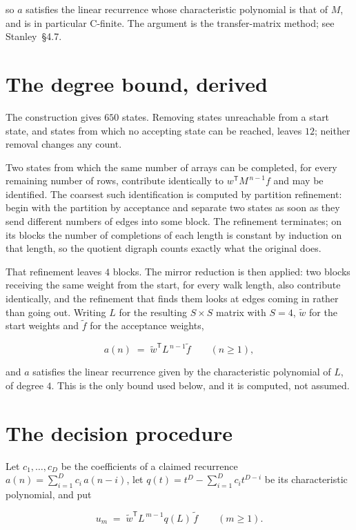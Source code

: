 \documentclass[11pt]{article}
\theoremstyle{definition}
\begin{document}
so $a$ satisfies the linear recurrence whose characteristic polynomial is that of $M$, and is in particular C-finite. The argument is the transfer-matrix method; see Stanley~\S4.7.

\section{The degree bound, derived}

The construction gives $650$ states. Removing states unreachable from a start state, and states from which no accepting state can be reached, leaves $12$; neither removal changes any count.

Two states from which the same number of arrays can be completed, for every remaining number of rows, contribute identically to $w^{\mathsf T}M^{\,n-1}f$ and may be identified. The coarsest such identification is computed by partition refinement: begin with the partition by acceptance and separate two states as soon as they send different numbers of edges into some block. The refinement terminates; on its blocks the number of completions of each length is constant by induction on that length, so the quotient digraph counts exactly what the original does.

That refinement leaves $4$ blocks. The mirror reduction is then applied: two blocks receiving the same weight from the start, for every walk length, also contribute identically, and the refinement that finds them looks at edges coming in rather than going out. Writing $L$ for the resulting $S \times S$ matrix with $S = 4$, $\tilde w$ for the start weights and $\tilde f$ for the acceptance weights,

\[a(n) \;=\; \tilde w^{\mathsf T} L^{\,n-1} \tilde f \qquad (n \ge 1),\]

and $a$ satisfies the linear recurrence given by the characteristic polynomial of $L$, of degree $4$. This is the only bound used below, and it is computed, not assumed.

\section{The decision procedure}

Let $c_1,\dots,c_D$ be the coefficients of a claimed recurrence $a(n) = \sum_{i=1}^{D} c_i\,a(n-i)$, let $q(t) = t^{D} - \sum_{i=1}^{D} c_i t^{D-i}$ be its characteristic polynomial, and put

\[u_m \;=\; \tilde w^{\mathsf T} L^{\,m-1} q(L)\,\tilde f \qquad (m \ge 1).\]
\end{document}
